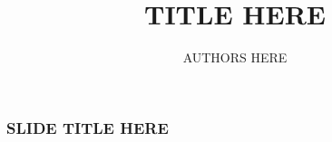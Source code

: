 \documentclass{beamer}
\begin{document}
\title{TITLE HERE}  
\author{AUTHORS HERE}
\begin{frame}
  \titlepage
\end{frame}

\begin{frame}
  \frametitle{SLIDE TITLE HERE}
  
\end{frame}
\end{document}
